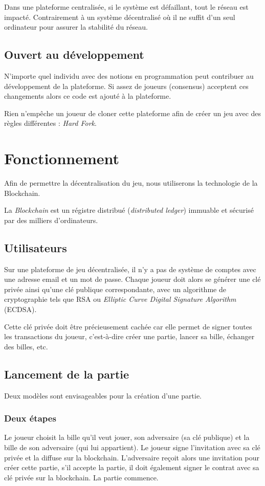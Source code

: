 \documentclass{article}
\begin{document}
Dans une plateforme centralisée, si le système est défaillant, tout le réseau est impacté. Contrairement à un système décentralisé où il ne suffit d'un seul ordinateur pour assurer la stabilité du réseau.

\subsection{Ouvert au développement}
N'importe quel individu avec des notions en programmation peut contribuer au développement de la plateforme.
Si assez de joueurs (consensus) acceptent ces changements alors ce code est ajouté à la plateforme.

Rien n'empêche un joueur de cloner cette plateforme afin de créer un jeu avec des règles différentes : \textit{Hard Fork}.

\section{Fonctionnement}
Afin de permettre la décentralisation du jeu, nous utiliserons la technologie de la Blockchain.

La \textit{Blockchain} est un régistre distribué (\textit{distributed ledger}) immuable et sécurisé par des milliers d'ordinateurs.

\subsection{Utilisateurs}
Sur une plateforme de jeu décentralisée, il n'y a pas de système de comptes avec une adresse email et un mot de passe.
Chaque joueur doit alors se générer une clé privée ainsi qu'une clé publique correspondante, avec un algorithme de cryptographie tels que RSA ou \textit{Elliptic Curve Digital Signature Algorithm} (ECDSA).

Cette clé privée doit être précieusement cachée car elle permet de signer toutes les transactions du joueur, c'est-à-dire créer une partie, lancer sa bille, échanger des billes, etc.

\subsection{Lancement de la partie}
Deux modèles sont envisageables pour la création d'une partie.
\subsubsection{Deux étapes}
Le joueur choisit la bille qu'il veut jouer, son adversaire (sa clé publique) et la bille de son adversaire (qui lui appartient). Le joueur signe l'invitation avec sa clé privée et la diffuse sur la blockchain. L'adversaire reçoit alors une invitation pour créer cette partie, s'il accepte la partie, il doit également signer le contrat avec sa clé privée sur la blockchain. La partie commence.
\end{document}
